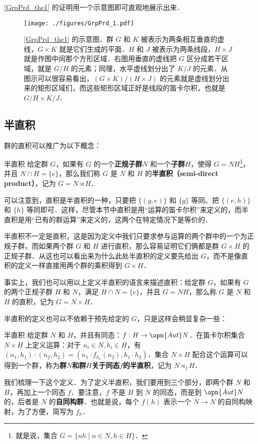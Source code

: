 \autoref{GrpPrd_the1} 的证明用一个示意图即可直观地展示出来．

\begin{figure}[ht]
\centering
\texttt{[image: ./figures/GrpPrd\_1.pdf]}
\caption{\autoref{GrpPrd_the1} 的示意图．群 $G$ 和 $K$ 被表示为两条相互垂直的虚线，$G\times K$ 就是它们生成的平面．$H$ 和 $J$ 被表示为两条线段，$H\times J$ 就是作图中间那个方形区域．右图用垂直的虚线把 $G$ 区分成若干区域，就是 $G/H$ 的元素；同理，水平虚线划分出了 $K/J$ 的元素．从图示可以很容易看出，$(G\times K)/(H\times J)$ 的元素就是虚线划分出来的矩形区域们，而这些矩形区域正好是线段的笛卡尔积，也就是 $G/H\times K/J$．} \label{GrpPrd_fig1}
\end{figure}


\subsection{半直积}

群的直积可以推广为以下概念：

\begin{definition}{半直积}
给定群 $G$，如果有 $G$ 的一个\textbf{正规子群}$N$ 和一个\textbf{子群}$H$，使得 $G = N H$\footnote{就是说，集合 $G= \{n h \mid n \in N, h\in H\}$．}，并且 $N \cap H = \{e\}$，那么我们称 $G$ 是 $N$ 和 $H$ 的\textbf{半直积（semi-direct product）}，记为 $G = N \rtimes H$．
\end{definition}

可以注意到，直积是半直积的一种，只要把 $\{(g, e)\}$ 和 $\{g\}$ 等同、把 $\{(e, h)\}$ 和 $\{h\}$ 等同即可．这样，尽管本节中直积是用“运算的笛卡尔积”来定义的，而半直积是用“已有的群运算”来定义的，这两个在特定情况下是等价的．

半直积不一定是直积，这是因为定义中我们只要求参与运算的两个群中的一个为正规子群，而如果两个群 $G$ 和 $H$ 进行直积，那么容易证明它们俩都是群 $G\times H$ 的正规子群．从这也可以看出来为什么此处半直积的定义要先给出 $G$，而不是像直积的定义一样直接用两个群的乘积得到 $G\times H$．

事实上，我们也可以用以上定义半直积的语言来描述直积：给定群 $G$，如果有 $G$ 的两个正规子群 $H$ 和 $N$，满足 $H\cap N=\{e\}$，并且 $G=NH$，那么称 $G$ 是 $N$ 和 $H$ 的直积，记为 $G=N\times H$．

半直积的定义也可以不依赖于预先给定的 $G$，只是这样会稍显复杂一些：

\begin{definition}{半直积}
给定群 $N$ 和 $H$，并且有同态：$f:H\rightarrow \opn{Aut}N$．在笛卡尔积集合 $N\times H$ 上定义运算：对于 $n_i\in N, h_i\in H$，有 $(n_1, h_1)\cdot(n_2, h_2)=(n_1\cdot f_{h_1}(n_2), h_1\cdot h_2)$．集合 $N\times H$ 配合这个运算可以得到一个群，称为\textbf{群}$N$\textbf{和群}$H$\textbf{关于同态}$f$\textbf{的半直积}，记为 $N\rtimes_fH$．
\end{definition}

我们梳理一下这个定义．为了定义半直积，我们要用到三个部分，即两个群 $N$ 和 $H$，再加上一个同态 $f$．要注意，$f$ 不是 $H$ 到 $N$ 的同态，而是到 $\opn{Aut} N$ 的，后者是 $N$ 的\textbf{自同构群}．也就是说，每个 $f(h)$ 表示一个 $N\rightarrow N$ 的自同构映射，为了方便，简写为 $f_h$．














